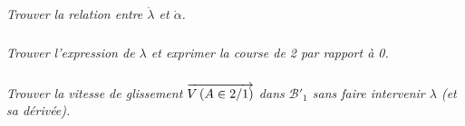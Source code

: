 \documentclass[10pt,oneside]{article}
\begin{document}
\subparagraph{}
\textit{Trouver la relation entre $\dot{\lambda}$ et $\dot{\alpha}$.}


\subparagraph{}
\textit{Trouver l'expression de $\lambda$ et exprimer la course de 2 par rapport à 0. }

\subparagraph{}
\textit{Trouver la vitesse de glissement $\overrightarrow{V\left( {A} \in {2}/{1}\right)}$ dans $\mathcal{B}'_1$ sans faire intervenir $\lambda$ (et sa dérivée).}
\end{document}
